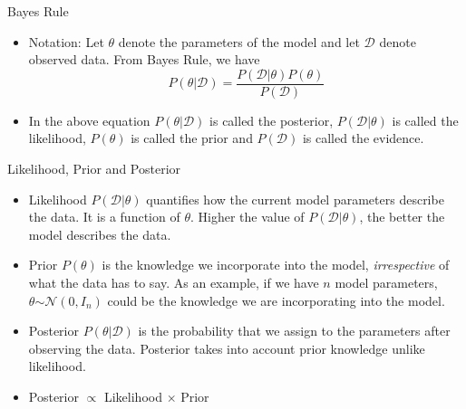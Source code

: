 \documentclass{beamer}
\begin{document}
\begin{frame}{Bayes Rule}
\begin{itemize}[<+->]

	\item Notation: Let $\theta$ denote the parameters of the model and let $\mathcal{D}$ denote observed data. From Bayes Rule, we have 
	\begin{equation*}
	    P(\theta | \mathcal{D}) = \frac{ P(\mathcal{D}|\theta)P(\theta) }{P(\mathcal{D})}
	\end{equation*}
	\item In the above equation $P(\theta | \mathcal{D})$ is called the posterior, $P(\mathcal{D}|\theta)$ is called the likelihood, $P(\theta)$ is called the prior and $P(\mathcal{D})$ is called the evidence.
	
\end{itemize}
\end{frame}
\begin{frame}{Likelihood, Prior and Posterior}
\begin{itemize}[<+->]
	
	\item Likelihood $P(\mathcal{D}|\theta)$ quantifies how the current model parameters describe the data. It is a function of $\theta$.  Higher the value of $P(\mathcal{D}|\theta)$, the better the model describes the data.
	\item Prior $P(\theta)$ is the knowledge we incorporate into the model, \emph{irrespective} of what the data has to say. As an example, if we have $n$ model parameters, $\theta \stackrel{}{\sim} \mathcal{N}(0,I_n)$ could be the knowledge we are incorporating into the model.
	\item Posterior $P(\theta | \mathcal{D})$ is the probability that we assign to the parameters after observing the data. Posterior takes into account prior knowledge unlike likelihood.
	\item Posterior $\propto$ Likelihood $\times$ Prior
\end{itemize}
\end{frame}
\end{document}

